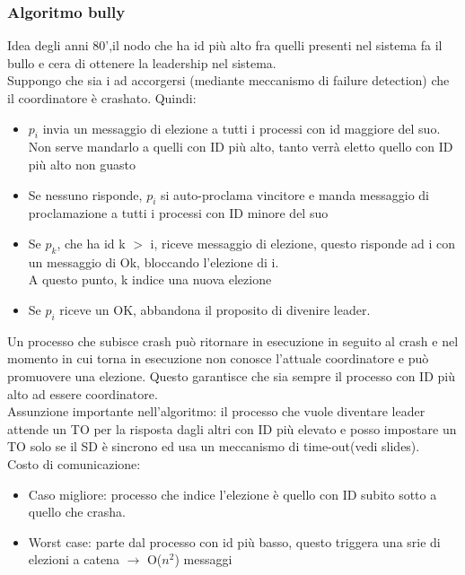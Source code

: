\documentclass[16px]{article}
\begin{document}
\subsubsection{Algoritmo bully}
Idea degli anni 80',il nodo che ha id più alto fra quelli presenti nel sistema fa il bullo e cera di ottenere la leadership nel sistema.\\ Suppongo che sia i ad accorgersi (mediante meccanismo di failure detection) che il coordinatore è crashato. Quindi:
\begin{itemize}
\item $p_i$ invia un messaggio di elezione a tutti i processi con id maggiore del suo. Non serve mandarlo a quelli con ID più alto, tanto verrà eletto quello con ID più alto non guasto
\item Se nessuno risponde, $p_i$ si auto-proclama vincitore e manda messaggio di proclamazione a tutti i processi con ID minore del suo
\item Se $p_k$, che ha id k $>$ i, riceve messaggio di elezione, questo risponde ad i con un messaggio di Ok, bloccando l'elezione di i.\\ A questo punto, k indice una nuova elezione
\item Se $p_i$ riceve un OK, abbandona il proposito di divenire leader.
\end{itemize}
Un processo che subisce crash può ritornare in esecuzione in seguito al crash e nel momento in cui torna in esecuzione non conosce l'attuale coordinatore e può promuovere una elezione. Questo garantisce che sia sempre il processo con ID più alto ad essere coordinatore.\\ Assunzione importante nell'algoritmo: il processo che vuole diventare leader attende un TO per la risposta dagli altri con ID più elevato e posso impostare un TO solo se il SD è sincrono ed usa un meccanismo di time-out(vedi slides).\\ Costo di comunicazione:
\begin{itemize}
\item Caso migliore: processo che indice l'elezione è quello con ID subito sotto a quello che crasha.
\item Worst case: parte dal processo con id più basso, questo triggera una srie di elezioni a catena $\rightarrow$ O($n^2$) messaggi
\end{itemize}
\end{document}
